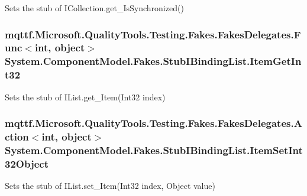 Sets the stub of I\-Collection.\-get\-\_\-\-Is\-Synchronized()

\hypertarget{class_system_1_1_component_model_1_1_fakes_1_1_stub_i_binding_list_a26255672991ad079033fefed5aab3520}{
\subsubsection[{Item\-Get\-Int32}]{\setlength{\rightskip}{0pt plus 5cm}mqttf.\-Microsoft.\-Quality\-Tools.\-Testing.\-Fakes.\-Fakes\-Delegates.\-Func$<$int, object$>$ System.\-Component\-Model.\-Fakes.\-Stub\-I\-Binding\-List.\-Item\-Get\-Int32}}\label{class_system_1_1_component_model_1_1_fakes_1_1_stub_i_binding_list_a26255672991ad079033fefed5aab3520}


Sets the stub of I\-List.\-get\-\_\-\-Item(\-Int32 index)

\hypertarget{class_system_1_1_component_model_1_1_fakes_1_1_stub_i_binding_list_ad962ab775192d374190883a53ddce96d}{
\subsubsection[{Item\-Set\-Int32\-Object}]{\setlength{\rightskip}{0pt plus 5cm}mqttf.\-Microsoft.\-Quality\-Tools.\-Testing.\-Fakes.\-Fakes\-Delegates.\-Action$<$int, object$>$ System.\-Component\-Model.\-Fakes.\-Stub\-I\-Binding\-List.\-Item\-Set\-Int32\-Object}}\label{class_system_1_1_component_model_1_1_fakes_1_1_stub_i_binding_list_ad962ab775192d374190883a53ddce96d}


Sets the stub of I\-List.\-set\-\_\-\-Item(\-Int32 index, Object value)

